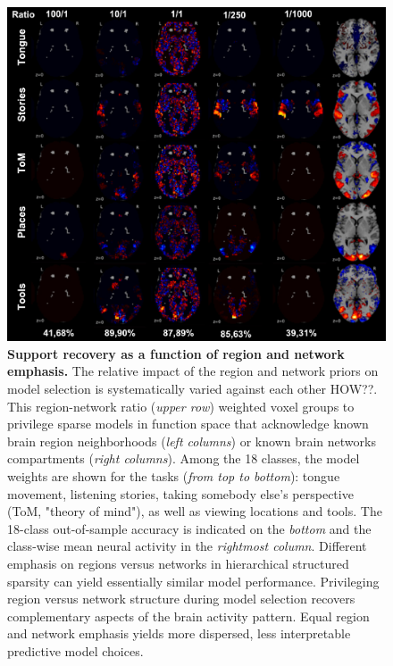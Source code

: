 \documentclass{article} %
\begin{document}
\begin{figure}
\begin{centering}
\includegraphics[width=1.00\textwidth]{figures/reg_net_ratio.pdf}
\end{centering}
\vspace{-0.6cm}
\caption{\textbf{Support recovery as a function of
region and network emphasis.}
The relative impact of the region and network priors
on model selection
is systematically varied against each other {\color{red} HOW??}.
This region-network ratio (\textit{upper row}) weighted voxel groups
to privilege sparse models in function space
that acknowledge known brain region neighborhoods
(\textit{left columns}) or
known brain networks compartments
(\textit{right columns}).
Among the 18 classes, the model weights are shown for the
tasks (\textit{from top to bottom}): tongue movement, listening stories,
taking somebody else's perspective (ToM, "theory of mind"),
as well as
viewing locations and tools.
The 18-class out-of-sample accuracy is indicated
on the \textit{bottom} and
the class-wise mean neural activity
in the \textit{rightmost column}.
%
Different emphasis on regions versus networks
in hierarchical structured sparsity can
yield essentially similar model performance.
%
Privileging region versus network structure during model selection
recovers complementary aspects of the brain activity pattern.
%
Equal region and network emphasis yields more dispersed,
less interpretable predictive model choices.
}
\label{fig_ratio}
\end{figure}
\end{document}
